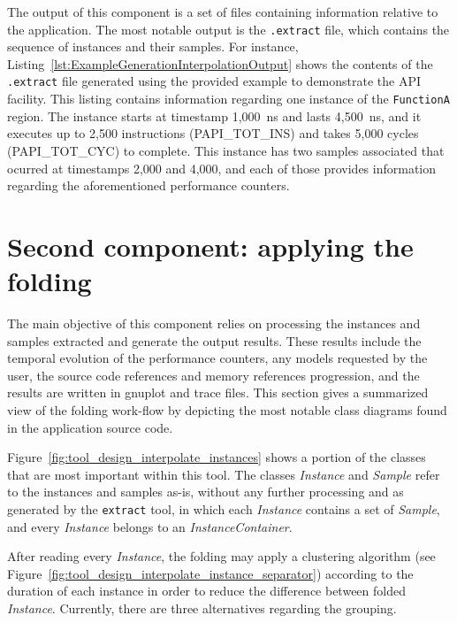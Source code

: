 The output of this component is a set of files containing information relative to the application. 
The most notable output is the \texttt{.extract} file, which contains the sequence of instances and their samples.
For instance, Listing~\ref{lst:ExampleGenerationInterpolationOutput} shows the contents of the \texttt{.extract} file generated using the provided example to demonstrate the API facility.
This listing contains information regarding one instance of the \texttt{FunctionA} region.
The instance starts at timestamp 1,000~ns and lasts 4,500~ns, and it executes up to 2,500 instructions (PAPI\_TOT\_INS) and takes 5,000 cycles (PAPI\_TOT\_CYC) to complete.
This instance has two samples associated that ocurred at timestamps 2,000 and 4,000, and each of those provides information regarding the aforementioned performance counters.



\section{Second component: applying the folding}

The main objective of this component relies on processing the instances and samples extracted and generate the output results.
These results include the temporal evolution of the performance counters, any models requested by the user, the source code references and memory references progression, and the results are written in gnuplot and \PARAVER trace files.
This section gives a summarized view of the folding work-flow by depicting the most notable class diagrams found in the application source code.



Figure~\ref{fig:tool_design_interpolate_instances} shows a portion of the classes that are most important within this tool.
The classes \textsl{Instance} and \textsl{Sample} refer to the instances and samples as-is, without any further processing and as generated by the \texttt{extract} tool, in which each \textsl{Instance} contains a set of \textsl{Sample}, and every \textsl{Instance} belongs to an \textsl{InstanceContainer}.



After reading every \textsl{Instance}, the folding may apply a clustering algorithm (see Figure~\ref{fig:tool_design_interpolate_instance_separator}) according to the duration of each instance in order to reduce the difference between folded \textsl{Instance}.
Currently, there are three alternatives regarding the grouping.

